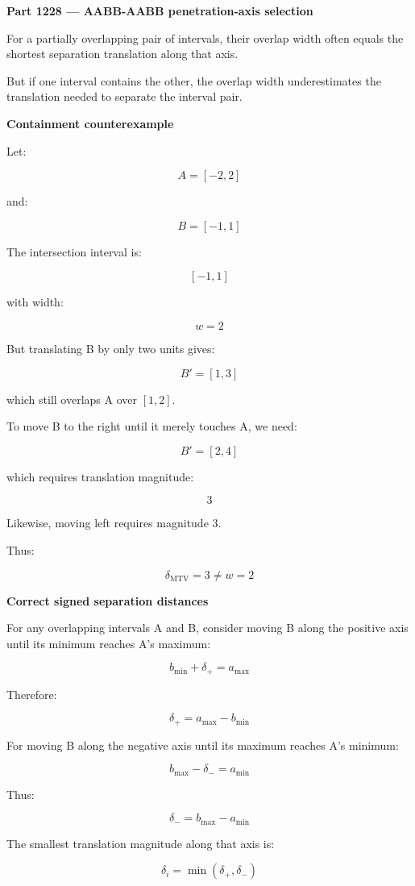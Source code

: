 \textbf{Part 1228 --- AABB-AABB penetration-axis selection}

For a partially overlapping pair of intervals, their overlap width often equals the shortest separation translation along that axis.

But if one interval contains the other, the overlap width underestimates the translation needed to separate the interval pair.

\textbf{Containment counterexample}

Let:

\[
A=[-2,2]
\]

and:

\[
B=[-1,1]
\]

The intersection interval is:

\[
[-1,1]
\]

with width:

\[
w=2
\]

But translating B by only two units gives:

\[
B'=[1,3]
\]

which still overlaps A over \([1,2]\).

To move B to the right until it merely touches A, we need:

\[
B'=[2,4]
\]

which requires translation magnitude:

\[
3
\]

Likewise, moving left requires magnitude \(3\).

Thus:

\[
\boxed{\delta_{\mathrm{MTV}}=3\ne w=2}
\]

\textbf{Correct signed separation distances}

For any overlapping intervals A and B, consider moving B along the positive axis until its minimum reaches A's maximum:

\[
b_{\min}+\delta_+=a_{\max}
\]

Therefore:

\[
\boxed{ \delta_+=a_{\max}-b_{\min} }
\]

For moving B along the negative axis until its maximum reaches A's minimum:

\[
b_{\max}-\delta_-=a_{\min}
\]

Thus:

\[
\boxed{ \delta_-=b_{\max}-a_{\min} }
\]

The smallest translation magnitude along that axis is:

\[
\boxed{ \delta_i=\min(\delta_+,\delta_-) }
\]

